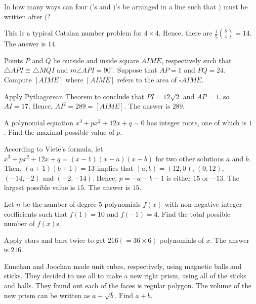 \begin{problem}
In how many ways can four $($'s and $)$'s be arranged in a line such that $)$ must be written after $($?
\end{problem}

\begin{solution}
This is a typical Catalan number problem for $4\times4$. Hence, there are $\frac{1}{5}\binom{8}{4}=14$. The answer is $14$.
\end{solution}

\begin{problem}
Points $P$ and $Q$ lie outside and inside square $AIME$, respectively such that $\triangle API \cong \triangle MQI$ and $m\angle API = 90^\circ$. Suppose that $AP=1$ and $PQ=24$. Compute $[AIME]$ where $[AIME]$ refers to the area of $\square AIME$.
\end{problem}

\begin{solution}
Apply Pythagorean Theorem to conclude that $PI=12\sqrt{2}$ and $AP=1$, so $AI=17$. Hence, $AI^2=289=[AIME]$. The answer is $289$.
\end{solution}

\begin{problem}
A polynomial equation $x^3+px^2+12x+q=0$ has integer roots, one of which is $1$. Find the maximal possible value of $p$.
\end{problem}

\begin{solution}
According to Viete's formula, let $x^3+px^2+12x+q=(x-1)(x-a)(x-b)$ for two other solutions $a$ and $b$. Then, $(a+1)(b+1)=13$ implies that $(a,b)=(12,0)$, $(0,12)$, $(-14,-2)$ and $(-2,-14)$. Hence, $p=-a-b-1$ is either $15$ or $-13$. The largest possible value is $15$. The answer is $15$.
\end{solution}

\begin{problem}
Let $n$ be the number of degree $5$ polynomials $f(x)$ with non-negative integer coefficients such that $f(1)=10$ and $f(-1)=4$. Find the total possible number of $f(x)$s.
\end{problem}

\begin{solution}
Apply stars and bars twice to get $216(=36\times6)$ polynomials of $x$. The answer is $216$.
\end{solution}

\begin{problem}
Eunchan and Joochan made unit cubes, respectively, using magnetic balls and sticks. They decided to use all to make a new right prism, using all of the sticks and balls. They found out each of the faces is regular polygon. The volume of the new prism can be written as $a+\sqrt{b}$. Find $a+b$.
\end{problem}


